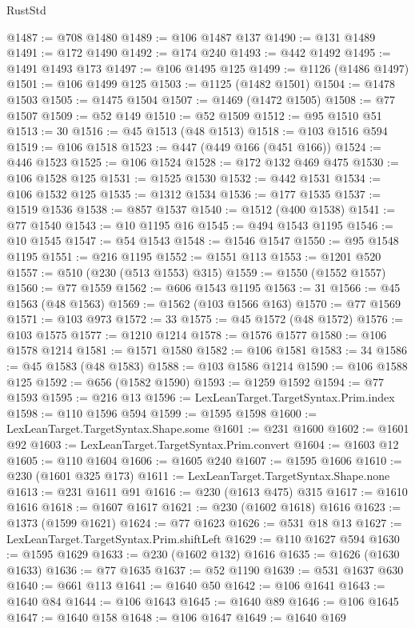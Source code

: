 \begin{lexlean}{RustStd}
\begin{coremodule}
@1487 := @708 @1480
@1489 := @106 @1487 @137
@1490 := @131 @1489
@1491 := @172 @1490
@1492 := @174 @240
@1493 := @442 @1492
@1495 := @1491 @1493 @173
@1497 := @106 @1495 @125
@1499 := @1126 (@1486 @1497)
@1501 := @106 @1499 @125
@1503 := @1125 (@1482 @1501)
@1504 := @1478 @1503
@1505 := @1475 @1504
@1507 := @1469 (@1472 @1505)
@1508 := @77 @1507
@1509 := @52 @149
@1510 := @52 @1509
@1512 := @95 @1510 @51
@1513 := 30
@1516 := @45 @1513 (@48 @1513)
@1518 := @103 @1516 @594
@1519 := @106 @1518
@1523 := @447 (@449 @166 (@451 @166))
@1524 := @446 @1523
@1525 := @106 @1524
@1528 := @172 @132 @469 @475
@1530 := @106 @1528 @125
@1531 := @1525 @1530
@1532 := @442 @1531
@1534 := @106 @1532 @125
@1535 := @1312 @1534
@1536 := @177 @1535
@1537 := @1519 @1536
@1538 := @857 @1537
@1540 := @1512 (@400 @1538)
@1541 := @77 @1540
@1543 := @10 @1195 @16
@1545 := @494 @1543 @1195
@1546 := @10 @1545
@1547 := @54 @1543
@1548 := @1546 @1547
@1550 := @95 @1548 @1195
@1551 := @216 @1195
@1552 := @1551 @113
@1553 := @1201 @520
@1557 := @510 (@230 (@513 @1553) @315)
@1559 := @1550 (@1552 @1557)
@1560 := @77 @1559
@1562 := @606 @1543 @1195
@1563 := 31
@1566 := @45 @1563 (@48 @1563)
@1569 := @1562 (@103 @1566 @163)
@1570 := @77 @1569
@1571 := @103 @973
@1572 := 33
@1575 := @45 @1572 (@48 @1572)
@1576 := @103 @1575
@1577 := @1210 @1214
@1578 := @1576 @1577
@1580 := @106 @1578 @1214
@1581 := @1571 @1580
@1582 := @106 @1581
@1583 := 34
@1586 := @45 @1583 (@48 @1583)
@1588 := @103 @1586 @1214
@1590 := @106 @1588 @125
@1592 := @656 (@1582 @1590)
@1593 := @1259 @1592
@1594 := @77 @1593
@1595 := @216 @13
@1596 := LexLeanTarget.TargetSyntax.Prim.index
@1598 := @110 @1596 @594
@1599 := @1595 @1598
@1600 := LexLeanTarget.TargetSyntax.Shape.some
@1601 := @231 @1600
@1602 := @1601 @92
@1603 := LexLeanTarget.TargetSyntax.Prim.convert
@1604 := @1603 @12
@1605 := @110 @1604
@1606 := @1605 @240
@1607 := @1595 @1606
@1610 := @230 (@1601 @325 @173)
@1611 := LexLeanTarget.TargetSyntax.Shape.none
@1613 := @231 @1611 @91
@1616 := @230 (@1613 @475) @315
@1617 := @1610 @1616
@1618 := @1607 @1617
@1621 := @230 (@1602 @1618) @1616
@1623 := @1373 (@1599 @1621)
@1624 := @77 @1623
@1626 := @531 @18 @13
@1627 := LexLeanTarget.TargetSyntax.Prim.shiftLeft
@1629 := @110 @1627 @594
@1630 := @1595 @1629
@1633 := @230 (@1602 @132) @1616
@1635 := @1626 (@1630 @1633)
@1636 := @77 @1635
@1637 := @52 @1190
@1639 := @531 @1637 @630
@1640 := @661 @113
@1641 := @1640 @50
@1642 := @106 @1641
@1643 := @1640 @84
@1644 := @106 @1643
@1645 := @1640 @89
@1646 := @106 @1645
@1647 := @1640 @158
@1648 := @106 @1647
@1649 := @1640 @169

\end{coremodule}
\end{lexlean}
